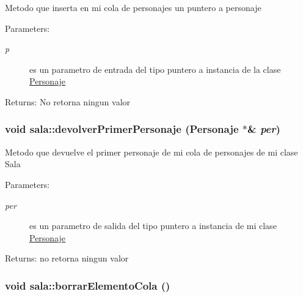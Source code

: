 Metodo que inserta en mi cola de personajes un puntero a personaje \begin{Desc}
\item[Parameters:]
\begin{description}
\item[{\em p}]es un parametro de entrada del tipo puntero a instancia de la clase \hyperlink{classPersonaje}{Personaje} \end{description}
\end{Desc}
\begin{Desc}
\item[Returns:]No retorna ningun valor \end{Desc}
\hypertarget{classsala_306fe8573f4ed40792d59a7f9e580b30}{
\subsubsection[devolverPrimerPersonaje]{\setlength{\rightskip}{0pt plus 5cm}void sala::devolverPrimerPersonaje ({\bf Personaje} $\ast$\& {\em per})}}
\label{classsala_306fe8573f4ed40792d59a7f9e580b30}


Metodo que devuelve el primer personaje de mi cola de personajes de mi clase Sala \begin{Desc}
\item[Parameters:]
\begin{description}
\item[{\em per}]es un parametro de salida del tipo puntero a instancia de mi clase \hyperlink{classPersonaje}{Personaje} \end{description}
\end{Desc}
\begin{Desc}
\item[Returns:]no retorna ningun valor \end{Desc}
\hypertarget{classsala_6bf07428f9bca5ff621845ac18b34ee4}{
\subsubsection[borrarElementoCola]{\setlength{\rightskip}{0pt plus 5cm}void sala::borrarElementoCola ()}}
\label{classsala_6bf07428f9bca5ff621845ac18b34ee4}


